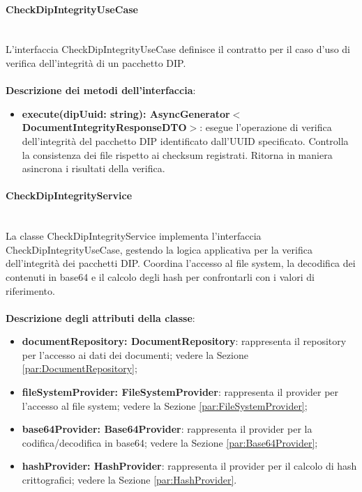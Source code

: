 \documentclass[a4paper,12pt]{article}
\begin{document}
{{{                \paragraph{CheckDipIntegrityUseCase}\label{par:CheckDipIntegrityUseCase}\mbox{}\\
                L'interfaccia CheckDipIntegrityUseCase definisce il contratto per il caso d'uso di verifica dell'integrità di un pacchetto DIP.\\
                \\
              \noindent \textbf{Descrizione dei metodi dell'interfaccia}:
                \begin{itemize}
                    \item \textbf{execute(dipUuid: string): AsyncGenerator$<$DocumentIntegrityResponseDTO$>$}: esegue l'operazione di verifica dell'integrità del pacchetto DIP identificato dall'UUID specificato. Controlla la consistenza dei file rispetto ai checksum registrati. Ritorna in maniera asincrona i risultati della verifica.
                \end{itemize}
                \paragraph{CheckDipIntegrityService}\label{par:CheckDipIntegrityService}\mbox{}\\
                La classe CheckDipIntegrityService implementa l'interfaccia CheckDipIntegrityUseCase, gestendo la logica applicativa per la verifica dell'integrità dei pacchetti DIP. Coordina l'accesso al file system, la decodifica dei contenuti in base64 e il calcolo degli hash per confrontarli con i valori di riferimento.\\
                \\
                \textbf{Descrizione degli attributi della classe}:
                \begin{itemize}
                    \item \textbf{documentRepository: DocumentRepository}: rappresenta il repository per l'accesso ai dati dei documenti; vedere la Sezione \ref{par:DocumentRepository};
                    \item \textbf{fileSystemProvider: FileSystemProvider}: rappresenta il provider per l'accesso al file system; vedere la Sezione \ref{par:FileSystemProvider};
                    \item \textbf{base64Provider: Base64Provider}: rappresenta il provider per la codifica/decodifica in base64; vedere la Sezione \ref{par:Base64Provider};
                    \item \textbf{hashProvider: HashProvider}: rappresenta il provider per il calcolo di hash crittografici; vedere la Sezione \ref{par:HashProvider}.
                \end{itemize}
                
}}}
\end{document}
